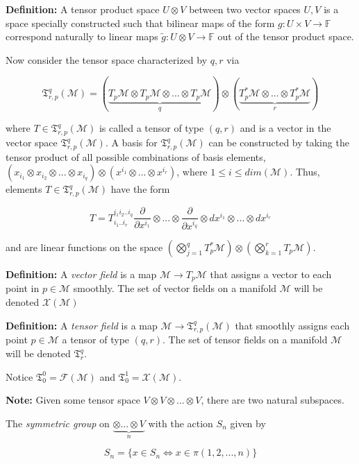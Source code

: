 \documentclass{article}\usepackage[]{graphicx}\usepackage[]{color}
\newcommand{\M}{\mathcal{M}}
\begin{document}
%


\textbf{Definition:} A tensor product space $U\otimes V$ between two vector spaces $ U,V $ is a space specially constructed such that bilinear maps of the form $g:U\times V\rightarrow\mathbb{F}$ correspond naturally to linear maps $\tilde{g}:U\otimes V\rightarrow\mathbb{F}$ out of the tensor product space.  
 
Now consider the tensor space characterized by $q,r$ via

$$
\mathfrak{T}^q_{r,p}(\M )= (\underbrace{ T_p\M\otimes T_p\M\otimes ... \otimes T_p\M }_q)\otimes (
\underbrace{T_p^*\M\otimes ...\otimes T^*_p\M }_r)
$$

where $T\in\mathfrak{T}^q_{r,p}(\M )$ is called a tensor of type $(q,r)$ and is a vector in the vector space $\mathfrak{T}^q_{r,p}(\M )$. A basis for $\mathfrak{T}^q_{r,p}(\M )$ can be constructed by taking the tensor product of all possible combinations of basis elements, $(x_{i_{1}}\otimes x_{i_{2}}\otimes ... \otimes x_{i_{q}})\otimes (x^{i_{1}}\otimes ... \otimes x^{i_{r}})$, where $1\leq i\leq dim(\M )$. Thus, elements $T\in\mathfrak{T}^q_{r,p}(\M )$ have the form 

$$
T=T^{i_1i_2..i_q}_{i_1..i_r}\frac{\partial}{\partial x^{i_1}}\otimes...\otimes\frac{\partial}{\partial x^{i_q}}\otimes dx^{i_1} \otimes ... \otimes dx^{i_r}
$$

and are linear functions on the space $\left(\bigotimes_{j=1}^{q}T^*_p\M \right) \otimes\left(  \bigotimes_{k=1}^{r}T_p\M\right)$.

\textbf{Definition:} A \textit{vector field} is a map $\M\rightarrow T_p\M$ that assigns a vector to each point in $p\in\M$ smoothly. The set of vector fields on a manifold $\M$ will be denoted $\mathcal{X}(\M)$

\textbf{Definition:} A \textit{tensor field} is a map $\M \rightarrow \mathfrak{T}^q_{r,p}(\M )$ that smoothly assigns each point $p\in\M$ a tensor of type $(q,r)$. The set of tensor fields on a manifold $\M$ will be denoted $\mathfrak{T}^q_{r}$.

Notice $\mathfrak{T}^0_0=\mathcal{F}(\M)$ and $\mathfrak{T}^1_0=\mathcal{X}(\M)$.
  

\textbf{Note:} Given some tensor space $V\otimes V\otimes...\otimes V$, there are two natural subspaces.

The \textit{symmetric group} on $\underbrace{\otimes ... \otimes V}_n$ with the action $S_n$ given by 

$$
S_n=\lbrace x\in S_n \iff x\in \pi (1,2,...,n)\rbrace
$$
\end{document}
